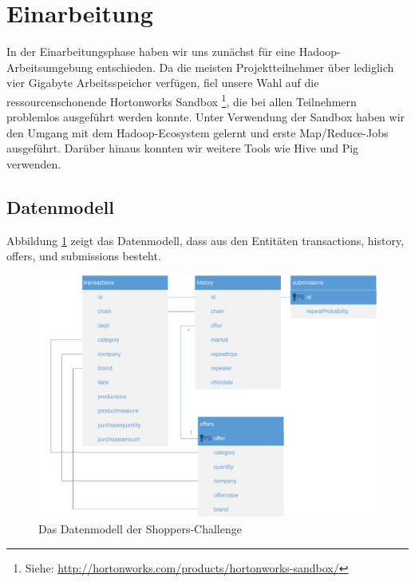 \section{Einarbeitung}
In der Einarbeitungsphase haben wir uns zunächst für eine Hadoop-Arbeitsumgebung entschieden. Da die meisten Projektteilnehmer über lediglich vier Gigabyte Arbeitsspeicher verfügen, fiel unsere Wahl auf die ressourcenschonende Hortonworks Sandbox \footnote{Siehe: \url{http://hortonworks.com/products/hortonworks-sandbox/}}, die bei allen Teilnehmern problemlos ausgeführt werden konnte. Unter Verwendung der Sandbox haben wir den Umgang mit dem Hadoop-Ecosystem gelernt und erste Map/Reduce-Jobs ausgeführt. Darüber hinaus konnten wir weitere Tools wie Hive und Pig verwenden.

\subsection{Datenmodell}
Abbildung \ref{fig:ShoppersTables} zeigt das Datenmodell, dass aus den Entitäten transactions, history, offers, und submissions besteht. 

\begin{figure}[h]
\centering
\includegraphics[width=1\linewidth]{Bilder/ShoppersTables}
\caption{Das Datenmodell der Shoppers-Challenge}
\label{fig:ShoppersTables}
\end{figure}

